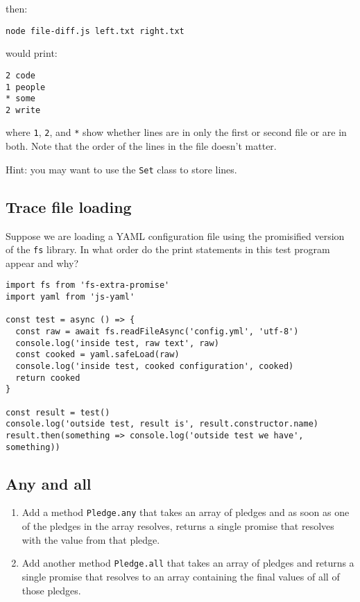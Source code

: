 \documentclass[krantzl]{krantz}
\begin{document}
\noindent then:

\begin{lstlisting}[frame=tblr]
node file-diff.js left.txt right.txt
\end{lstlisting}


\noindent would print:

\begin{lstlisting}[frame=tblr]
2 code
1 people
* some
2 write
\end{lstlisting}


\noindent where \texttt{1}, \texttt{2}, and \texttt{*} show whether lines are in only the first or second file
or are in both.
Note that the order of the lines in the file doesn’t matter.


Hint: you may want to use the \texttt{Set} class to store lines.

\subsection*{Trace file loading}


Suppose we are loading a YAML configuration file
using the promisified version of the \texttt{fs} library.
In what order do the print statements in this test program appear and why?


\begin{lstlisting}[frame=tblr]
import fs from 'fs-extra-promise'
import yaml from 'js-yaml'

const test = async () => {
  const raw = await fs.readFileAsync('config.yml', 'utf-8')
  console.log('inside test, raw text', raw)
  const cooked = yaml.safeLoad(raw)
  console.log('inside test, cooked configuration', cooked)
  return cooked
}

const result = test()
console.log('outside test, result is', result.constructor.name)
result.then(something => console.log('outside test we have', something))
\end{lstlisting}


\subsection*{Any and all}

\begin{enumerate}

\item 

Add a method \texttt{Pledge.any} that takes an array of pledges
    and as soon as one of the pledges in the array resolves,
    returns a single promise that resolves with the value from that pledge.



\item 

Add another method \texttt{Pledge.all} that takes an array of pledges
    and returns a single promise that resolves to an array
    containing the final values of all of those pledges.



\end{enumerate}
\end{document}

